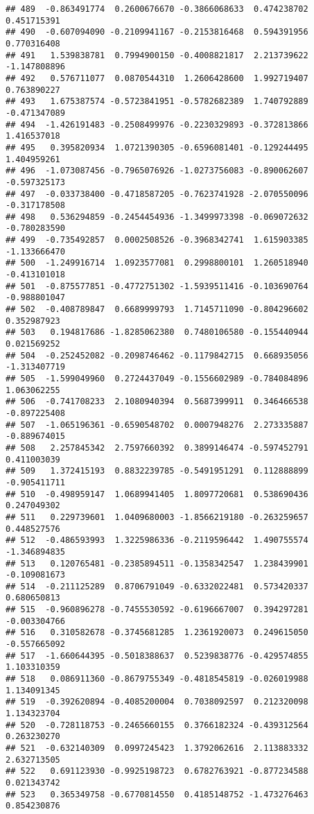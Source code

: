 \documentclass[
]{article}
\begin{document}
\begin{verbatim}
## 489  -0.863491774  0.2600676670 -0.3866068633  0.474238702  0.451715391
## 490  -0.607094090 -0.2109941167 -0.2153816468  0.594391956  0.770316408
## 491   1.539838781  0.7994900150 -0.4008821817  2.213739622 -1.147808896
## 492   0.576711077  0.0870544310  1.2606428600  1.992719407  0.763890227
## 493   1.675387574 -0.5723841951 -0.5782682389  1.740792889 -0.471347089
## 494  -1.426191483 -0.2508499976 -0.2230329893 -0.372813866  1.416537018
## 495   0.395820934  1.0721390305 -0.6596081401 -0.129244495  1.404959261
## 496  -1.073087456 -0.7965076926 -1.0273756083 -0.890062607 -0.597325173
## 497  -0.033738400 -0.4718587205 -0.7623741928 -2.070550096 -0.317178508
## 498   0.536294859 -0.2454454936 -1.3499973398 -0.069072632 -0.780283590
## 499  -0.735492857  0.0002508526 -0.3968342741  1.615903385 -1.133666470
## 500  -1.249916714  1.0923577081  0.2998800101  1.260518940 -0.413101018
## 501  -0.875577851 -0.4772751302 -1.5939511416 -0.103690764 -0.988801047
## 502  -0.408789847  0.6689999793  1.7145711090 -0.804296602  0.352987923
## 503   0.194817686 -1.8285062380  0.7480106580 -0.155440944  0.021569252
## 504  -0.252452082 -0.2098746462 -0.1179842715  0.668935056 -1.313407719
## 505  -1.599049960  0.2724437049 -0.1556602989 -0.784084896  1.063062255
## 506  -0.741708233  2.1080940394  0.5687399911  0.346466538 -0.897225408
## 507  -1.065196361 -0.6590548702  0.0007948276  2.273335887 -0.889674015
## 508   2.257845342  2.7597660392  0.3899146474 -0.597452791  0.411003039
## 509   1.372415193  0.8832239785 -0.5491951291  0.112888899 -0.905411711
## 510  -0.498959147  1.0689941405  1.8097720681  0.538690436  0.247049302
## 511   0.229739601  1.0409680003 -1.8566219180 -0.263259657  0.448527576
## 512  -0.486593993  1.3225986336 -0.2119596442  1.490755574 -1.346894835
## 513   0.120765481 -0.2385894511 -0.1358342547  1.238439901 -0.109081673
## 514  -0.211125289  0.8706791049 -0.6332022481  0.573420337  0.680650813
## 515  -0.960896278 -0.7455530592 -0.6196667007  0.394297281 -0.003304766
## 516   0.310582678 -0.3745681285  1.2361920073  0.249615050 -0.557665092
## 517  -1.660644395 -0.5018388637  0.5239838776 -0.429574855  1.103310359
## 518   0.086911360 -0.8679755349 -0.4818545819 -0.026019988  1.134091345
## 519  -0.392620894 -0.4085200004  0.7038092597  0.212320098  1.134323704
## 520  -0.728118753 -0.2465660155  0.3766182324 -0.439312564  0.263230270
## 521  -0.632140309  0.0997245423  1.3792062616  2.113883332  2.632713505
## 522   0.691123930 -0.9925198723  0.6782763921 -0.877234588  0.021343742
## 523   0.365349758 -0.6770814550  0.4185148752 -1.473276463  0.854230876

\end{verbatim}
\end{document}
